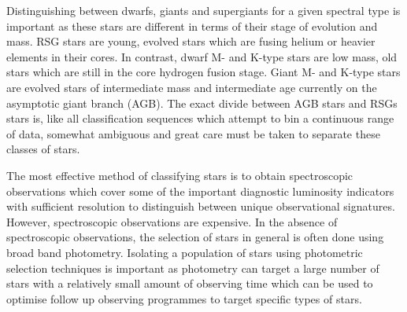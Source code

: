 

Distinguishing between dwarfs, giants and supergiants for a given spectral type is important as these stars are different in terms of their stage of evolution and mass.
RSG stars are young, evolved stars which are fusing helium or heavier elements in their cores.
In contrast, dwarf M- and K-type stars are low mass, old stars which are still in the core hydrogen fusion stage.
Giant M- and K-type stars are evolved stars of intermediate mass and intermediate age currently on the asymptotic giant branch (AGB).
The exact divide between AGB stars and RSGs stars is, like all classification sequences which attempt to bin a continuous range of data, somewhat ambiguous and great care must be taken to separate these classes of stars.

The most effective method of classifying stars is to obtain spectroscopic observations which cover some of the important diagnostic luminosity indicators with sufficient resolution to distinguish between unique observational signatures.
However, spectroscopic observations are expensive.
In the absence of spectroscopic observations, the selection of stars in general is often done using broad band photometry.
Isolating a population of stars using photometric selection techniques is important as photometry can target a large number of stars with a relatively small amount of observing time which can be used to optimise follow up observing programmes to target specific types of stars.

